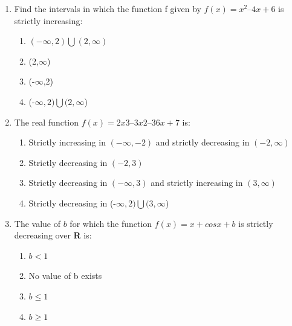 \documentclass{article}
\begin{document}
\begin{enumerate}
\begin{enumerate}
\end{enumerate}


\item Find the intervals in which the function f given by $f(x) = x^2 – 4x + 6$ is strictly
increasing:

\begin{enumerate}

     \item $(-\infty,2) \bigcup (2,\infty)$ 
     
     \item (2,$\infty$) 

     \item (-$\infty$,2) 

     \item (-$\infty,2) \bigcup (2,\infty$) 

\end{enumerate}


\newpage

\item The real function $f(x) = 2x3 – 3x2 – 36x + 7$ is:

\begin{enumerate}

     \item Strictly increasing in $(-\infty,-2)$ and strictly decreasing in $(-2,\infty)$
     
     \item Strictly decreasing in $(-2,3)$ 

     \item Strictly decreasing in $(-\infty,3)$ and strictly increasing in $(3,\infty)$ 

     \item Strictly decreasing in (-$\infty,2) \bigcup (3,\infty$) 

\end{enumerate}


\item The value of $b$  for which the function $f(x) = x + cosx + b$ is strictly decreasing over \textbf{R} is:
\begin{enumerate}

     \item $b < 1$ 
     
     \item No value of b exists 

     \item $b \leq 1$ 

     \item $b \geq 1$ 


\end{enumerate}
\end{enumerate}
\end{document}
